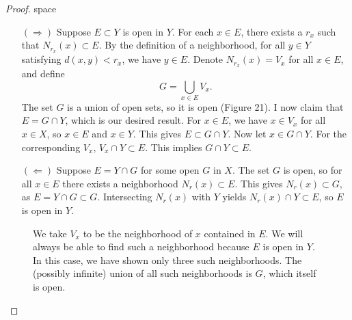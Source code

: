 \documentclass{article}
\theoremstyle{definition}
\begin{document}
\begin{proof}{\color{white}space}
	\begin{enumerate}
		\item[$ (\Longrightarrow) $] Suppose $ E\subset Y $ is open in $ Y $. For each $ x\in E $, there exists a $ r_x $ such that $ N_{r_x}(x)\subset E $. By the definition of a neighborhood, for all $ y\in Y $ satisfying $ d(x,y)<r_x $, we have $ y\in E $. Denote $ N_{r_x}(x)=V_x $ for all $ x\in E $, and define $$G=\bigcup_{x\in E}V_x .$$ The set $ G $ is a union of open sets, so it is open (Figure 21). I now claim that $ E=G\cap Y $, which is our desired result. For $ x\in E $, we have $ x\in V_x $ for all $ x\in X $, so $ x\in E $ and $ x\in Y $. This gives $ E\subset G\cap Y $. Now let $ x\in G\cap Y $. For the corresponding $ V_x $, $ V_x\cap Y\subset E $. This implies $ G\cap Y\subset E $.    
		\item[$ (\Longleftarrow) $] Suppose $ E=Y\cap G $ for some open $ G $ in $ X $. The set $ G $ is open, so for all $ x\in E $ there exists a neighborhood $ N_r(x)\subset E $. This gives $ N_r(x)\subset G $, as $ E=Y\cap G\subset G $. Intersecting $ N_r(x) $ with $ Y $ yields $ N_r(x)\cap Y\subset E $, so $ E $ is open in $ Y $.  
	\end{enumerate}	
 \begin{figure}[h!]
	\centering
	\caption{We take $ V_x $ to be the neighborhood of $ x $ contained in $ E $. We will always be able to find such a neighborhood because $ E $ is open in $ Y $. In this case, we have shown only three such neighborhoods. The (possibly infinite) union of all such neighborhoods is $ G $, which itself is open.}  
\end{figure}
\end{proof}
\end{document}
